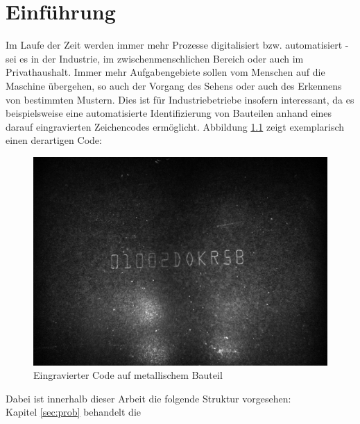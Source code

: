\chapter{Einführung}
\label{sec:intro}
	
	Im Laufe der Zeit werden immer mehr Prozesse digitalisiert bzw. 
	automatisiert - sei es in der Industrie, im zwischenmenschlichen 
	Bereich oder auch im Privathaushalt. Immer mehr Aufgabengebiete sollen vom 
	Menschen auf die Maschine übergehen, so auch der Vorgang des Sehens oder 
	auch des Erkennens von bestimmten Mustern. Dies ist für Industriebetriebe 
	insofern interessant, da es beispielsweise eine automatisierte 
	Identifizierung von Bauteilen anhand eines darauf eingravierten 
	Zeichencodes ermöglicht. Abbildung \ref{fig:example-code} zeigt 
	exemplarisch einen derartigen Code:
	\begin{figure}[h]
		\centering
		\includegraphics[width=0.5\linewidth]{beispielcode}
		\caption{Eingravierter Code auf metallischem Bauteil}
		\label{fig:example-code}
	\end{figure}
	
	
	
	Dabei ist innerhalb dieser Arbeit die folgende Struktur vorgesehen: \\
	Kapitel \ref{sec:prob} behandelt die 
